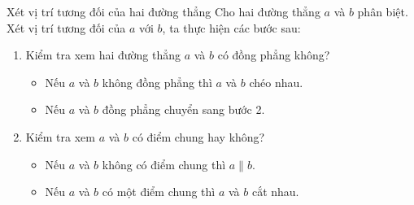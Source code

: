 \begin{enumerate}[\iconMT]
\begin{luuy}
	\end{luuy}
\end{enumerate}

\begin{dang} {Xét vị trí tương đối của hai đường thẳng}
	Cho hai đường thẳng $a$ và $b$ phân biệt. Xét vị trí tương đối của $a$ với $b$, ta thực hiện các bước sau:
	\begin{enumerate}[\iconMT]
		\item {}  Kiểm tra xem hai đường thẳng $a$ và $b$ có đồng phẳng không?
		\begin{itemize}
			\item Nếu $a$ và $b$ không đồng phẳng thì $a$ và $b$ chéo nhau.
			\item Nếu $a$ và $b$ đồng phẳng chuyển sang bước 2.
		\end{itemize}
		\item {} Kiểm tra xem $a$ và $b$ có điểm chung hay không?
		\begin{itemize}
			\item Nếu $a$ và $b$ không có điểm chung thì $a\parallel b$.
			\item Nếu $a$ và $b$ có một điểm chung thì $a$ và $b$ cắt nhau.
		\end{itemize}
	\end{enumerate}
\end{dang}

